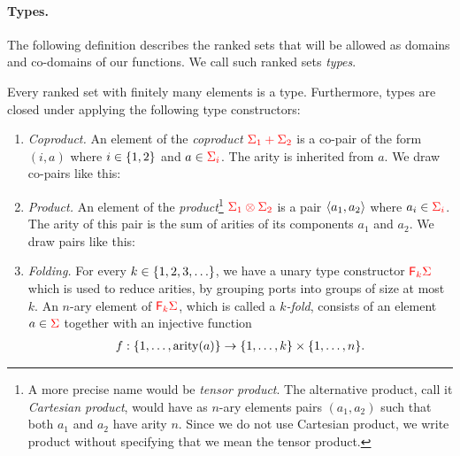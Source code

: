 \paragraph*{Types.} The following definition describes the  ranked sets that will be allowed as domains and co-domains of our functions.  We call such ranked sets \emph{types}.



\begin{definition}[Types] \label{def:types} Every  ranked set with finitely many elements is a type. Furthermore, types are closed under applying the following type constructors:
    \begin{enumerate}
       \item \emph{Coproduct.} An element of the \emph{coproduct} ${\color{red}{\Sigma_1 + \Sigma_2}}$ is a co-pair of the form  $(i,a)$ where $i \in \{1,2\}$ and $a \in {\color{red}{\Sigma_i}}$. The arity is inherited from $a$. We draw co-pairs like this:
              \item       \emph{Product.} An element of the   \emph{product}\footnote{
                  A more precise name would be \emph{tensor product}. The alternative product, call it \emph{Cartesian product}, would have as $n$-ary elements  pairs $(a_1,a_2)$ such that both $a_1$ and $a_2$ have arity $n$. Since we do not use Cartesian product, we write product without specifying that we mean the tensor product.
              } ${\color{red}{\Sigma_1 \otimes \Sigma_2}}$  is a  pair $\langle{a_1,a_2}\rangle$ where $a_i \in {\color{red}{\Sigma_i}}$. The arity  of this pair is the sum of arities of its components $a_1$ and $a_2$. We draw pairs like this:
        \item \emph{Folding.} For every $k \in \{1,2,3,\ldots\}$, we have a unary type constructor ${\color{red}{\mathsf F_{k}}}{\color{red}{\Sigma}}$  which is used to reduce arities, by grouping ports into groups of size at most $k$.  An $n$-ary element of ${\color{red}{\mathsf F_{k}}}{\color{red}{\Sigma}}$, which is called a \emph{$k$-fold}, consists of an element      $a \in {\color{red}{\Sigma}}$  together with an  injective  function
            \begin{align*}
                f : \set{1,\ldots,\arity a} \to \set{1,\ldots,k} \times  \set{1,\ldots,n}.

\end{align*}
\end{enumerate}
\end{definition}
